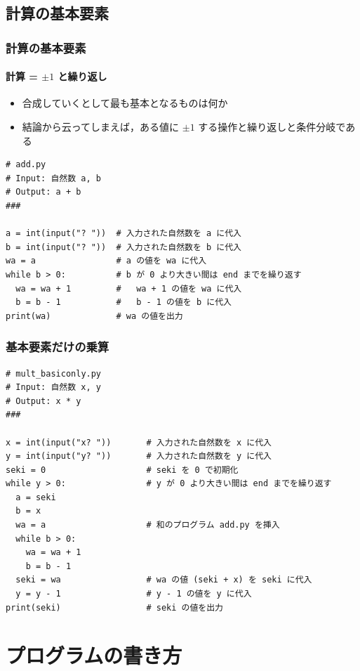 \subsection{計算の基本要素}
\begin{frame}[fragile]
\frametitle{計算の基本要素}
\framesubtitle{計算 = \(\pm 1\) と繰り返し}
  \begin{itemize}
\item 合成していくとして最も基本となるものは何か
\item 結論から云ってしまえば，ある値に $\pm 1$ する操作と繰り返しと条件分岐である
  \end{itemize}
  \begin{lstlisting}[caption={加算},label=add]
# add.py
# Input: 自然数 a, b
# Output: a + b
###

a = int(input("? "))  # 入力された自然数を a に代入
b = int(input("? "))  # 入力された自然数を b に代入
wa = a                # a の値を wa に代入
while b > 0:          # b が 0 より大きい間は end までを繰り返す
  wa = wa + 1         #   wa + 1 の値を wa に代入
  b = b - 1           #   b - 1 の値を b に代入
print(wa)             # wa の値を出力
  \end{lstlisting}
\end{frame}
\begin{frame}[fragile,label=mult,shrink]
\frametitle{基本要素だけの乗算}
  \begin{lstlisting}[caption={乗算},label=lst:mult]
# mult_basiconly.py
# Input: 自然数 x, y
# Output: x * y
###

x = int(input("x? "))       # 入力された自然数を x に代入
y = int(input("y? "))       # 入力された自然数を y に代入
seki = 0                    # seki を 0 で初期化
while y > 0:                # y が 0 より大きい間は end までを繰り返す
  a = seki
  b = x
  wa = a                    # 和のプログラム add.py を挿入
  while b > 0:
    wa = wa + 1
    b = b - 1
  seki = wa                 # wa の値 (seki + x) を seki に代入
  y = y - 1                 # y - 1 の値を y に代入
print(seki)                 # seki の値を出力
  \end{lstlisting}
\hfill{\hyperlink{composit}{} \hyperlink{while}{}}
\end{frame}
\section{プログラムの書き方}
